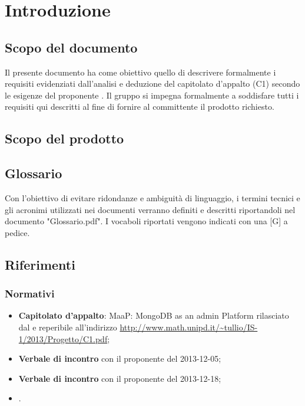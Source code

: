 \section{Introduzione}


\subsection{Scopo del documento}
Il presente documento ha come obiettivo quello di descrivere formalmente i requisiti evidenziati dall'analisi e deduzione del capitolato d'appalto \ProjectName{} (C1) secondo le esigenze del proponente \Proponente{}. Il gruppo \GroupName{} si impegna formalmente a soddisfare tutti i requisiti qui descritti al fine di fornire al committente il prodotto richiesto.

\subsection{Scopo del prodotto} 
\ScopoDelProdotto

\subsection{Glossario}
Con l'obiettivo di evitare ridondanze e ambiguità di linguaggio, i termini tecnici e gli acronimi utilizzati nei documenti verranno definiti e descritti riportandoli nel documento "Glossario.pdf". I vocaboli riportati vengono indicati con una [G] a pedice.

\subsection{Riferimenti}
	\subsubsection{Normativi}
	\begin{itemize}
	\item \textbf{Capitolato d'appalto}: MaaP: MongoDB as an admin Platform rilasciato dal  \Proponente{} e reperibile all'indirizzo \url{http://www.math.unipd.it/~tullio/IS-1/2013/Progetto/C1.pdf};
	\item \textbf{Verbale di incontro} con il proponente \Proponente{} del 2013-12-05;
	\item \textbf{Verbale di incontro} con il proponente \Proponente{} del 2013-12-18;
	\item \textbf{\NormeDiProgetto{}}. 
	\end{itemize}
	
